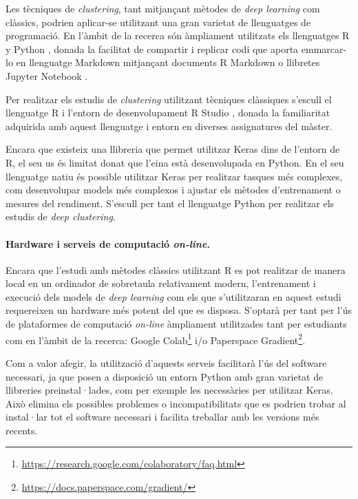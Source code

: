 \documentclass[CAT,BIB]{TFUOC}%
\begin{document}
            Les tècniques de \textit{clustering}, tant mitjançant mètodes de \textit{deep learning} com clàssics, podrien aplicar-se utilitzant una gran varietat de llenguatges de programació. En l'àmbit de la recerca són àmpliament utilitzats els llenguatges \textsf{R} \citep{RCoreTeam2017} y Python \citep{VanRossum2009} \citep{Kaggle2021}, donada la facilitat de compartir i replicar codi que aporta emmarcar-lo en llenguatge Markdown mitjançant documents R Markdown \citep{Xie2016} o llibretes Jupyter Notebook \citep{Kluyver2016}.

            Per realitzar els estudis de \textit{clustering} utilitzant tècniques clàssiques s'escull el llenguatge \textsf{R} i l'entorn de desenvolupament \textsf{R} Studio \citep{RStudioTeam2020}, donada la familiaritat adquirida amb aquest llenguatge i entorn en diverses assignatures del màster.

            Encara que existeix una llibreria que permet utilitzar Keras dins de l'entorn de \textsf{R}, el seu us és limitat donat que l'eina està desenvolupada en Python. En el seu llenguatge natiu és possible utilitzar Keras per realitzar tasques més complexes, com desenvolupar models més complexos i ajustar els mètodes d'entrenament o mesures del rendiment. S'escull per tant el llenguatge Python per realitzar els estudis de \textit{deep clustering}.

        \paragraph{Hardware i serveis de computació \textit{on-line}.}

            Encara que l'estudi amb mètodes clàssics utilitzant \textsf{R} es pot realitzar de manera local en un ordinador de sobretaula relativament modern, l'entrenament i execució dels models de \textit{deep learning} com els que s'utilitzaran en aquest estudi requereixen un hardware més potent del que es disposa. S'optarà per tant per l'ús de plataformes de computació \textit{on-line} àmpliament utilitzades tant per estudiants com en l'àmbit de la recerca: Google Colab\footnote{\url{https://research.google.com/colaboratory/faq.html}} i/o Paperspace Gradient\footnote{\url{https://docs.paperspace.com/gradient/}}.

            Com a valor afegir, la utilització d'aquests serveis facilitarà l'ús del software necessari, ja que posen a disposició un entorn Python amb gran varietat de llibreries preinstal·lades, com per exemple les necessàries per utilitzar Keras. Això elimina els possibles problemes o incompatibilitats que es podrien trobar al instal·lar tot el software necessari i facilita treballar amb les versions més recents.
\end{document}
